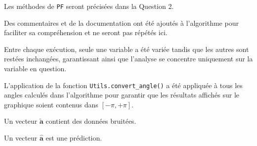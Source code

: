 \documentclass[../CSC_5RO12_TA_TP3.tex]{subfiles}
\begin{document}
Les méthodes de \texttt{PF} seront précisées dans la Question 2.
\begin{remark}
    Des commentaires et de la documentation ont été ajoutés à l'algorithme pour faciliter sa compréhension et ne seront pas répétés ici.
\end{remark}
\begin{remark}
    Entre chaque exécution, seule une variable a été variée tandis que les autres sont restées inchangées, garantissant ainsi que l'analyse se concentre uniquement sur la variable en question.
\end{remark}
\begin{remark}
    L'application de la fonction \texttt{Utils.convert\_angle()} a été appliquée à tous les angles calculés dans l'algorithme pour garantir que les résultats affichés sur le graphique soient contenus dans $[-\pi, +\pi]$.
\end{remark}
\begin{remark}
    Un vecteur $\widetilde{\mathbf{a}}$ contient des données bruitées.
\end{remark}
\begin{remark}
    Un vecteur $\hat{\mathbf{a}}$ est une prédiction.
\end{remark}

\newpage
\end{document}
